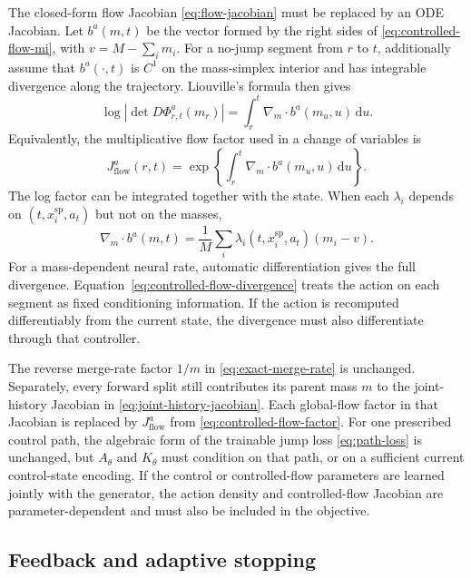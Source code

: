 \documentclass[10pt]{article}
\theoremstyle{definition}
\theoremstyle{remark}
\newcommand{\dd}{\,\mathrm{d}}
\begin{document}
The closed-form flow Jacobian \eqref{eq:flow-jacobian} must be replaced by
an ODE Jacobian.  Let $b^a(m,t)$ be the vector formed by the right sides of
\eqref{eq:controlled-flow-mi}, with $v=M-\sum_i m_i$.  For a no-jump
segment from $r$ to $t$, additionally assume that $b^a(\cdot,t)$ is $C^1$
on the mass-simplex interior and has integrable divergence along the
trajectory.  Liouville's formula then gives
\begin{equation}
  \log\left|\det D\Phi_{r,t}^{a}(m_r)\right|
  =\int_r^t \nabla_m\!\cdot b^a(m_u,u)\dd u.
  \label{eq:controlled-flow-jacobian}
\end{equation}
Equivalently, the multiplicative flow factor used in a change of variables is
\begin{equation}
  J_{\mathrm{flow}}^a(r,t)
  =\exp\!\left\{
    \int_r^t \nabla_m\!\cdot b^a(m_u,u)\dd u
  \right\}.
  \label{eq:controlled-flow-factor}
\end{equation}
The log factor can be integrated together with the state.  When each
$\lambda_i$ depends on $(t,x_i^{\mathrm{sp}},a_t)$ but not on the masses,
\begin{equation}
  \nabla_m\!\cdot b^a(m,t)
  =\frac{1}{M}\sum_i\lambda_i(t,x_i^{\mathrm{sp}},a_t)(m_i-v).
  \label{eq:controlled-flow-divergence}
\end{equation}
For a mass-dependent neural rate, automatic differentiation gives the full
divergence.  Equation~\eqref{eq:controlled-flow-divergence} treats the action
on each segment as fixed conditioning information.  If the action is
recomputed differentiably from the current state, the divergence must also
differentiate through that controller.

The reverse merge-rate factor $1/m$ in \eqref{eq:exact-merge-rate} is
unchanged.  Separately, every forward split still contributes its parent
mass $m$ to the joint-history Jacobian in
\eqref{eq:joint-history-jacobian}.  Each global-flow factor in that Jacobian
is replaced by $J_{\mathrm{flow}}^a$ from
\eqref{eq:controlled-flow-factor}.  For one prescribed control path, the
algebraic form of the trainable jump loss \eqref{eq:path-loss} is unchanged,
but $A_\theta$ and $K_\theta$ must condition on that path, or on a sufficient
current control-state encoding.  If the control or controlled-flow
parameters are learned jointly with the generator, the action density and
controlled-flow Jacobian are parameter-dependent and must also be included
in the objective.

\subsection{Feedback and adaptive stopping}
\end{document}
